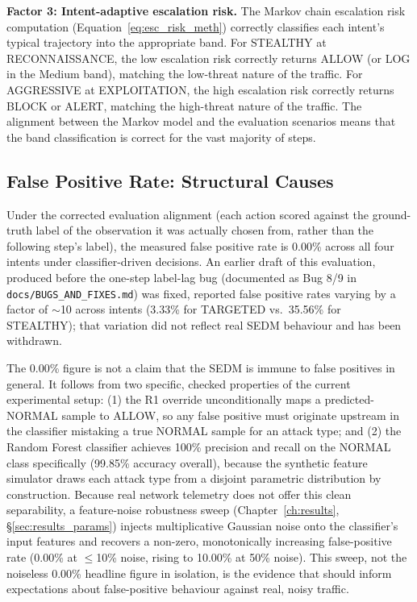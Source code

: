 \textbf{Factor 3: Intent-adaptive escalation risk.}
The Markov chain escalation risk computation (Equation~\ref{eq:esc_risk_meth})
correctly classifies each intent's typical trajectory into the appropriate
band.
For STEALTHY at RECONNAISSANCE, the low escalation risk correctly returns
ALLOW (or LOG in the Medium band), matching the low-threat nature of the
traffic.
For AGGRESSIVE at EXPLOITATION, the high escalation risk correctly returns
BLOCK or ALERT, matching the high-threat nature of the traffic.
The alignment between the Markov model and the evaluation scenarios means
that the band classification is correct for the vast majority of steps.

\subsection{False Positive Rate: Structural Causes}

Under the corrected evaluation alignment (each action scored against the
ground-truth label of the observation it was actually chosen from, rather
than the following step's label), the measured false positive rate is
0.00\% across all four intents under classifier-driven decisions. An
earlier draft of this evaluation, produced before the one-step label-lag
bug (documented as Bug 8/9 in \texttt{docs/BUGS\_AND\_FIXES.md}) was fixed,
reported false positive rates varying by a factor of $\sim$10 across
intents (3.33\% for TARGETED vs.\ 35.56\% for STEALTHY); that variation did
not reflect real SEDM behaviour and has been withdrawn.

The 0.00\% figure is not a claim that the SEDM is immune to false positives
in general.
It follows from two specific, checked properties of the current
experimental setup: (1) the R1 override unconditionally maps a
predicted-NORMAL sample to ALLOW, so any false positive must originate
upstream in the classifier mistaking a true NORMAL sample for an attack
type; and (2) the Random Forest classifier achieves 100\% precision and
recall on the NORMAL class specifically (99.85\% accuracy overall), because
the synthetic feature simulator draws each attack type from a disjoint
parametric distribution by construction.
Because real network telemetry does not offer this clean separability, a
feature-noise robustness sweep (Chapter~\ref{ch:results},
\S\ref{sec:results_params}) injects multiplicative Gaussian noise onto the
classifier's input features and recovers a non-zero, monotonically
increasing false-positive rate (0.00\% at $\le$10\% noise, rising to
10.00\% at 50\% noise).
This sweep, not the noiseless 0.00\% headline figure in isolation, is the
evidence that should inform expectations about false-positive behaviour
against real, noisy traffic.

